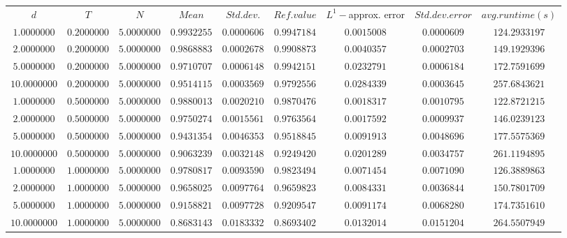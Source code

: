 \begin{tabular}{ccccccccc}
$d$ & $T$ & $N$ & $Mean$ & $Std. dev.$ & $Ref. value$ & $L^1-$approx. error & $Std. dev. error$ & $avg. runtime (s)$\\
$1.0000000$ & $0.2000000$ & $5.0000000$ & $0.9932255$ & $0.0000606$ & $0.9947184$ & $0.0015008$ & $0.0000609$ & $124.2933197$\\
$2.0000000$ & $0.2000000$ & $5.0000000$ & $0.9868883$ & $0.0002678$ & $0.9908873$ & $0.0040357$ & $0.0002703$ & $149.1929396$\\
$5.0000000$ & $0.2000000$ & $5.0000000$ & $0.9710707$ & $0.0006148$ & $0.9942151$ & $0.0232791$ & $0.0006184$ & $172.7591699$\\
$10.0000000$ & $0.2000000$ & $5.0000000$ & $0.9514115$ & $0.0003569$ & $0.9792556$ & $0.0284339$ & $0.0003645$ & $257.6843621$\\
$1.0000000$ & $0.5000000$ & $5.0000000$ & $0.9880013$ & $0.0020210$ & $0.9870476$ & $0.0018317$ & $0.0010795$ & $122.8721215$\\
$2.0000000$ & $0.5000000$ & $5.0000000$ & $0.9750274$ & $0.0015561$ & $0.9763564$ & $0.0017592$ & $0.0009937$ & $146.0239123$\\
$5.0000000$ & $0.5000000$ & $5.0000000$ & $0.9431354$ & $0.0046353$ & $0.9518845$ & $0.0091913$ & $0.0048696$ & $177.5575369$\\
$10.0000000$ & $0.5000000$ & $5.0000000$ & $0.9063239$ & $0.0032148$ & $0.9249420$ & $0.0201289$ & $0.0034757$ & $261.1194895$\\
$1.0000000$ & $1.0000000$ & $5.0000000$ & $0.9780817$ & $0.0093590$ & $0.9823494$ & $0.0071454$ & $0.0071090$ & $126.3889863$\\
$2.0000000$ & $1.0000000$ & $5.0000000$ & $0.9658025$ & $0.0097764$ & $0.9659823$ & $0.0084331$ & $0.0036844$ & $150.7801709$\\
$5.0000000$ & $1.0000000$ & $5.0000000$ & $0.9158821$ & $0.0097728$ & $0.9209547$ & $0.0091174$ & $0.0068280$ & $174.7351610$\\
$10.0000000$ & $1.0000000$ & $5.0000000$ & $0.8683143$ & $0.0183332$ & $0.8693402$ & $0.0132014$ & $0.0151204$ & $264.5507949$\\
\end{tabular}
